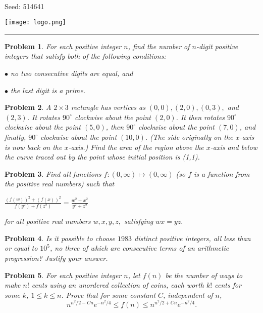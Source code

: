 \documentclass[12pt]{article}
\newtheorem{opg}{Problem}
\begin{document}
\parbox{0.6\textwidth}{ \\[2ex] {\Large Seed: 514641}}
\parbox{0.4\textwidth}{\texttt{[image: logo.png]}}

\hrule

\begin{opg}
For each positive integer $n$, find the number of $n$-digit positive integers that satisfy both of the following conditions:

$\bullet$ no two consecutive digits are equal, and

$\bullet$ the last digit is a prime.


\end{opg}
\begin{opg}
A $2 \times 3$ rectangle has vertices as $(0, 0), (2,0), (0,3),$ and $(2,
3)$. It rotates $90^\circ$ clockwise about the point $(2, 0)$. It then
rotates $90^\circ$ clockwise about the point $(5, 0)$, then $90^\circ$
clockwise about the point $(7, 0)$, and finally, $90^\circ$ clockwise
about the point $(10, 0)$. (The side originally on the $x$-axis is now
back on the $x$-axis.) Find the area of the region above the $x$-axis and
below the curve traced out by the point whose initial position is (1,1).

\end{opg}
\begin{opg}
Find all functions $f: (0, \infty) \mapsto (0, \infty)$ (so $f$ is a function from the positive real numbers) such that



$\frac {\left( f(w) \right)^2 + \left( f(x) \right)^2}{f(y^2) + f(z^2) } = \frac {w^2 + x^2}{y^2 + z^2}$



for all positive real numbers $w,x,y,z,$ satisfying $wx = yz.$




\end{opg}
\begin{opg}
Is it possible to choose $1983$ distinct positive integers, all less than or equal to $10^5$, no three of which are consecutive terms of an arithmetic progression? Justify your answer.


\end{opg}
\begin{opg}
For each positive integer $n$, let $f(n)$ be the number of ways to
make $n!$ cents using an unordered collection of coins, each worth $k!$
cents for some $k$, $1 \leq k \leq n$. Prove that for some constant $C$,
independent of $n$,
\[
n^{n^2/2 - Cn} e^{-n^2/4} \leq f(n) \leq n^{n^2/2 + Cn}e^{-n^2/4}.
\]

\end{opg}
\end{document}
